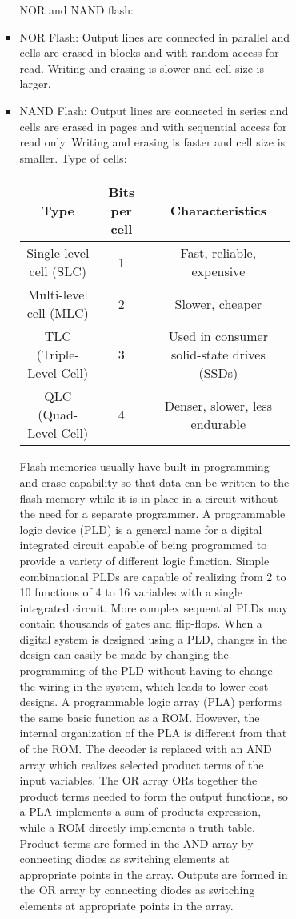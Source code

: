\documentclass[a4paper,12pt]{article}
\begin{document}
\begin{itemize}
\begin{itemize}
\begin{itemize}
\begin{itemize}
\begin{itemize}
\begin{itemize}
\begin{itemize}
NOR and NAND flash:
\bit
\item NOR Flash: Output lines are connected in parallel and cells are erased in blocks and with random access for read. Writing and erasing is slower and cell size is larger.
\item NAND Flash: Output lines are connected in series and cells are erased in pages and with sequential access for read only. Writing and erasing is faster and cell size is smaller.
\eit
Type of cells:
\begin{longtable}[c]{|c|c|c|}
\hline
Type & Bits per cell & Characteristics \\\hline
Single-level cell (SLC) & 1 & Fast, reliable, expensive \\\hline
Multi-level cell (MLC) & 2 & Slower, cheaper \\\hline
TLC (Triple-Level Cell) & 3 & Used in consumer solid-state drives (SSDs) \\\hline
QLC (Quad-Level Cell) & 4 & Denser, slower, less endurable \\\hline
\end{longtable}
Flash memories usually have built-in programming and erase capability so that data can be written to the flash memory while it is in place in a circuit without the need for a separate programmer.
\eit
{}
A programmable logic device (PLD) is a general name for a digital integrated circuit capable of being programmed to provide a variety of different logic function. Simple combinational PLDs are capable of realizing from 2 to 10 functions of 4 to 16 variables with a single integrated circuit. More complex sequential PLDs may contain thousands of gates and flip-flops. When a digital system is designed using a PLD, changes in the design can easily be made by changing the programming of the PLD without having to change the wiring in the system, which leads to lower cost designs.
A programmable logic array (PLA) performs the same basic function as a ROM. However, the internal organization of the PLA is different from that of the ROM. The decoder is replaced with an AND array which realizes selected product terms of the input variables. The OR array ORs together the product terms needed to form the output functions, so a PLA implements a sum-of-products expression, while a ROM directly implements a truth table. Product terms are formed in the AND array by connecting diodes as switching elements at appropriate points in the array. Outputs are formed in the OR array by connecting diodes as switching elements at appropriate points in the array.


\end{itemize}
\end{itemize}
\end{itemize}
\end{itemize}
\end{itemize}
\end{itemize}
\end{itemize}
\end{document}
